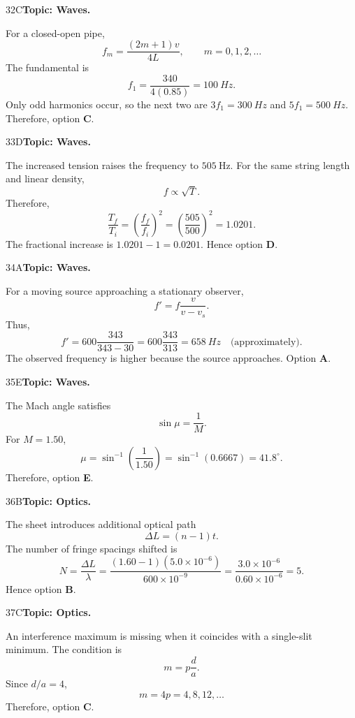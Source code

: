 \documentclass[10pt,a4paper]{physicsquiz}
\begin{document}
\begin{workedsolution}{32}{C}\textbf{Topic: Waves.}\par For a closed-open pipe,
  \[
    f_m=\frac{(2m+1)v}{4L},\qquad m=0,1,2,\ldots
  \]
  The fundamental is
  \[
    f_1=\frac{340}{4(0.85)}=\SI{100}{Hz}.
  \]
  Only odd harmonics occur, so the next two are \(3f_1=\SI{300}{Hz}\) and \(5f_1=\SI{500}{Hz}\). Therefore, option \textbf{C}.\end{workedsolution}
\begin{workedsolution}{33}{D}\textbf{Topic: Waves.}\par The increased tension raises the frequency to \(505\ \mathrm{Hz}\). For the same string length and linear density,
  \[
    f\propto\sqrt{T}.
  \]
  Therefore,
  \[
    \frac{T_f}{T_i}={\left(\frac{f_f}{f_i}\right)}^2
    ={\left(\frac{505}{500}\right)}^2=1.0201.
  \]
  The fractional increase is \(1.0201-1=0.0201\). Hence option \textbf{D}.\end{workedsolution}
\begin{workedsolution}{34}{A}\textbf{Topic: Waves.}\par For a moving source approaching a stationary observer,
  \[
    f'=f\frac{v}{v-v_s}.
  \]
  Thus,
  \[
    f'=600\frac{343}{343-30}
    =600\frac{343}{313}
    =\SI{658}{Hz}\quad\text{(approximately)}.
  \]
  The observed frequency is higher because the source approaches. Option \textbf{A}.\end{workedsolution}
\begin{workedsolution}{35}{E}\textbf{Topic: Waves.}\par The Mach angle satisfies
  \[
    \sin\mu=\frac{1}{M}.
  \]
  For \(M=1.50\),
  \[
    \mu=\sin^{-1}\left(\frac{1}{1.50}\right)
    =\sin^{-1}(0.6667)
    =41.8^\circ.
  \]
  Therefore, option \textbf{E}.\end{workedsolution}
\begin{workedsolution}{36}{B}\textbf{Topic: Optics.}\par The sheet introduces additional optical path
  \[
    \Delta L=(n-1)t.
  \]
  The number of fringe spacings shifted is
  \[
    N=\frac{\Delta L}{\lambda}
    =\frac{(1.60-1)(5.0\times10^{-6})}{600\times10^{-9}}
    =\frac{3.0\times10^{-6}}{0.60\times10^{-6}}=5.
  \]
  Hence option \textbf{B}.\end{workedsolution}
\begin{workedsolution}{37}{C}\textbf{Topic: Optics.}\par An interference maximum is missing when it coincides with a single-slit minimum. The condition is
  \[
    m=p\frac{d}{a}.
  \]
  Since \(d/a=4\),
  \[
    m=4p=4,8,12,\ldots
  \]
  Therefore, option \textbf{C}.\end{workedsolution}
\end{document}
